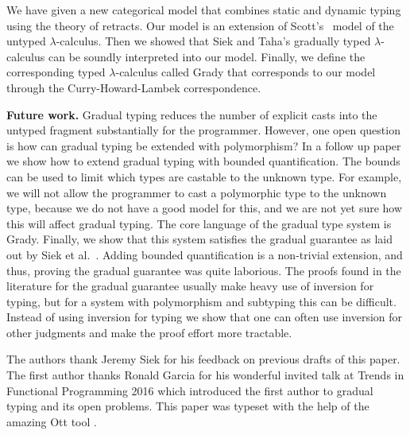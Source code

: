 We have given a new categorical model that combines static and dynamic
typing using the theory of retracts.  Our model is an extension of
Scott's~\cite{Scott:1980} model of the untyped $\lambda$-calculus.
Then we showed that Siek and Taha's gradually typed $\lambda$-calculus
\cite{Siek:2015} can be soundly interpreted into our model.  Finally,
we define the corresponding typed $\lambda$-calculus called Grady that
corresponds to our model through the Curry-Howard-Lambek
correspondence.

\textbf{Future work.}  Gradual typing reduces the number of explicit
casts into the untyped fragment substantially for the programmer.
However, one open question is how can gradual typing be extended with
polymorphism?  In a follow up paper we show how to extend gradual
typing with bounded quantification.  The bounds can be used to limit
which types are castable to the unknown type.  For example, we will
not allow the programmer to cast a polymorphic type to the unknown
type, because we do not have a good model for this, and we are not yet
sure how this will affect gradual typing.  The core language of the
gradual type system is Grady.  Finally, we show that this system
satisfies the gradual guarantee as laid out by Siek et
al.~\cite{Siek:2015}.  Adding bounded quantification is a non-trivial
extension, and thus, proving the gradual guarantee was quite
laborious. The proofs found in the literature for the gradual
guarantee usually make heavy use of inversion for typing, but for a
system with polymorphism and subtyping this can be difficult.  Instead
of using inversion for typing we show that one can often use inversion
for other judgments and make the proof effort more tractable.

\begin{acks}
  The authors thank Jeremy Siek for his feedback on previous drafts of
  this paper.  The first author thanks Ronald Garcia for his wonderful
  invited talk at Trends in Functional Programming 2016 which
  introduced the first author to gradual typing and its open problems.
  This paper was typeset with the help of the amazing Ott tool
  \cite{Sewell:2010}.
\end{acks}
